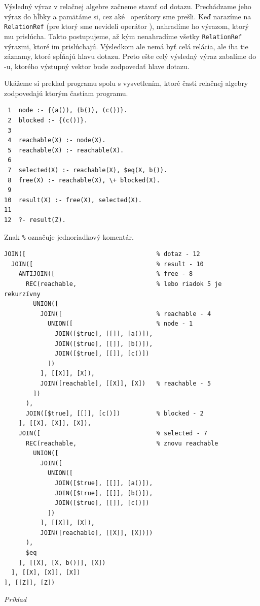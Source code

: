 Výsledný výraz v relačnej algebre začneme stavať od dotazu. Prechádzame jeho výraz do hĺbky a
pamätáme si, cez aké \REC\ operátory sme prešli. Keď narazíme na \texttt{RelationRef} (pre ktorý sme
nevideli operátor \REC), nahradíme ho výrazom, ktorý mu prislúcha. Takto postupujeme, až kým
nenahradíme všetky \texttt{RelationRef} výrazmi, ktoré im prislúchajú. Výsledkom ale nemá byť celá
relácia, ale iba tie záznamy, ktoré spĺňajú hlavu dotazu. Preto ešte celý výsledný výraz zabalíme do
\JOIN-u, ktorého výstupný vektor bude zodpovedať hlave dotazu.

\medskip

    Ukážeme si preklad programu spolu s vysvetlením, ktoré časti relačnej algebry zodpovedajú ktorým
    častiam programu.
\begin{verbatim}
 1  node :- {(a()), (b()), (c())}.
 2  blocked :- {(c())}.
 3  
 4  reachable(X) :- node(X).
 5  reachable(X) :- reachable(X).
 6  
 7  selected(X) :- reachable(X), $eq(X, b()).
 8  free(X) :- reachable(X), \+ blocked(X).
 9  
10  result(X) :- free(X), selected(X).
11  
12  ?- result(Z).
\end{verbatim}

Znak \texttt{\%} označuje jednoriadkový komentár.

\begin{verbatim}
JOIN([                                    % dotaz - 12
  JOIN([                                  % result - 10
    ANTIJOIN([                            % free - 8
      REC(reachable,                      % lebo riadok 5 je rekurzívny
        UNION([
          JOIN([                          % reachable - 4
            UNION([                       % node - 1
              JOIN([$true], [[]], [a()]),
              JOIN([$true], [[]], [b()]),
              JOIN([$true], [[]], [c()])
            ])
          ], [[X]], [X]),
          JOIN([reachable], [[X]], [X])   % reachable - 5
        ])
      ),
      JOIN([$true], [[]], [c()])          % blocked - 2
    ], [[X], [X]], [X]),
    JOIN([                                % selected - 7
      REC(reachable,                      % znovu reachable
        UNION([
          JOIN([
            UNION([
              JOIN([$true], [[]], [a()]),
              JOIN([$true], [[]], [b()]),
              JOIN([$true], [[]], [c()])
            ])
          ], [[X]], [X]),
          JOIN([reachable], [[X]], [X])])
      ),
      $eq
    ], [[X], [X, b()]], [X])
  ], [[X], [X]], [X])
], [[Z]], [Z])
\end{verbatim}
\begin{center}
\centering
\textit{Príklad \thepriklad}
\end{center}
\medskip

